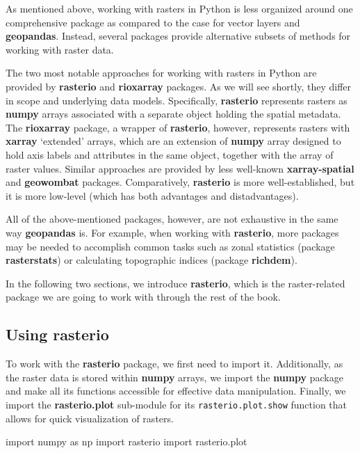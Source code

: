 \documentclass[
  letterpaper,
]{krantz}
\newenvironment{Shaded}{\begin{snugshade}}{\end{snugshade}}
\newcommand{\ImportTok}[1]{\textcolor[rgb]{0.00,0.46,0.62}{#1}}
\newcommand{\NormalTok}[1]{\textcolor[rgb]{0.00,0.23,0.31}{#1}}
\begin{document}
As mentioned above, working with rasters in Python is less organized
around one comprehensive package as compared to the case for vector
layers and \textbf{geopandas}. Instead, several packages provide
alternative subsets of methods for working with raster data.

The two most notable approaches for working with rasters in Python are
provided by \textbf{rasterio} and \textbf{rioxarray} packages. As we
will see shortly, they differ in scope and underlying data models.
Specifically, \textbf{rasterio} represents rasters as \textbf{numpy}
arrays associated with a separate object holding the spatial metadata.
The \textbf{rioxarray} package, a wrapper of \textbf{rasterio}, however,
represents rasters with \textbf{xarray} `extended' arrays, which are an
extension of \textbf{numpy} array designed to hold axis labels and
attributes in the same object, together with the array of raster values.
Similar approaches are provided by less well-known
\textbf{xarray-spatial} and \textbf{geowombat} packages. Comparatively,
\textbf{rasterio} is more well-established, but it is more low-level
(which has both advantages and distadvantages).

All of the above-mentioned packages, however, are not exhaustive in the
same way \textbf{geopandas} is. For example, when working with
\textbf{rasterio}, more packages may be needed to accomplish common
tasks such as zonal statistics (package \textbf{rasterstats}) or
calculating topographic indices (package \textbf{richdem}).

In the following two sections, we introduce \textbf{rasterio}, which is
the raster-related package we are going to work with through the rest of
the book.

\subsection{\texorpdfstring{Using
\textbf{rasterio}}{Using rasterio}}\label{sec-using-rasterio}

To work with the \textbf{rasterio} package, we first need to import it.
Additionally, as the raster data is stored within \textbf{numpy} arrays,
we import the \textbf{numpy} package and make all its functions
accessible for effective data manipulation. Finally, we import the
\textbf{rasterio.plot} sub-module for its \texttt{rasterio.plot.show}
function that allows for quick visualization of rasters.

\begin{Shaded}
\begin{Highlighting}[]
\ImportTok{import}\NormalTok{ numpy }\ImportTok{as}\NormalTok{ np}
\ImportTok{import}\NormalTok{ rasterio}
\ImportTok{import}\NormalTok{ rasterio.plot}
\end{Highlighting}
\end{Shaded}
\end{document}
